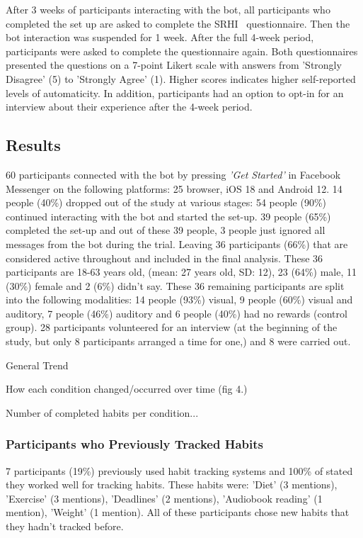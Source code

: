 \documentclass{scaffold/sigchi}
\begin{document}
After 3 weeks of participants interacting with the bot, all participants who completed the set up are asked to complete the SRHI~\cite{article_habit_strength} questionnaire. Then the bot interaction was suspended for 1 week. After the full 4-week period, participants were asked to complete the questionnaire again. Both questionnaires presented the questions on a 7-point Likert scale with answers from 'Strongly Disagree' (5) to 'Strongly Agree' (1). Higher scores indicates higher self-reported levels of automaticity. In addition, participants had an option to opt-in for an interview about their experience after the 4-week period.

\subsection{Results}
60 participants connected with the bot by pressing \textit{'Get Started'} in Facebook Messenger on the following platforms: 25 browser, iOS 18 and Android 12. 14 people (40\%) dropped out of the study at various stages: 54 people (90\%) continued interacting with the bot and started the set-up. 39 people (65\%) completed the set-up and out of these 39 people, 3 people just ignored all messages from the bot during the trial. Leaving 36 participants (66\%) that are considered active throughout and included in the final analysis. These 36 participants are 18-63 years old, (mean: 27 years old, SD: 12), 23 (64\%) male, 11 (30\%) female and 2 (6\%) didn't say. These 36 remaining participants are split into the following modalities: 14 people (93\%) visual, 9 people (60\%) visual and auditory, 7 people (46\%) auditory and 6 people (40\%) had no rewards (control group). 28 participants volunteered for an interview (at the beginning of the study, but only 8 participants arranged a time for one,) and 8 were carried out.

General Trend

How each condition changed/occurred over time (fig 4.)

Number of completed habits per condition...

\subsubsection{Participants who Previously Tracked Habits}
7 participants (19\%) previously used habit tracking systems and 100\% of stated they worked well for tracking habits. These habits were: 'Diet' (3 mentions), 'Exercise' (3 mentions), 'Deadlines' (2 mentions), 'Audiobook reading' (1 mention), 'Weight' (1 mention). All of these participants chose new habits that they hadn't tracked before.
\end{document}
